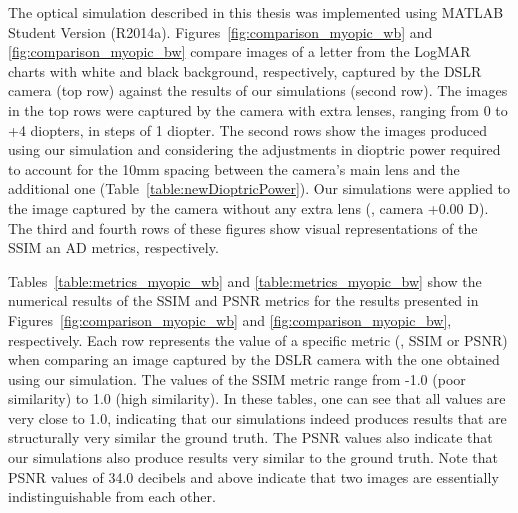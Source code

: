 %
The optical simulation described in this thesis was implemented using MATLAB Student Version (R2014a).
%
Figures~\ref{fig:comparison_myopic_wb} and \ref{fig:comparison_myopic_bw} compare images of a letter from the LogMAR charts with 
white and black background, respectively, captured by the DSLR camera (top row) against the results of our simulations (second row). 
The images in the top rows were captured by the camera with extra lenses, ranging from 0 to +4 diopters, in steps of 1 diopter. The second rows show the images produced using our simulation and considering the adjustments in dioptric power required to account for the 10mm spacing between the camera's main lens and the additional one (Table~\ref{table:newDioptricPower}). Our simulations were applied to the image captured by the camera without any extra lens (\ie, camera +0.00 D). The third and fourth rows of these figures show visual representations of the SSIM an AD metrics, respectively. 


Tables~\ref{table:metrics_myopic_wb} and \ref{table:metrics_myopic_bw} show the numerical results of the SSIM and PSNR metrics for the results presented in Figures~\ref{fig:comparison_myopic_wb} and \ref{fig:comparison_myopic_bw}, respectively. Each row represents the value of a specific metric (\ie, SSIM or PSNR) when comparing an image captured by the DSLR camera with the one obtained using our simulation.  
The values of the SSIM metric range from -1.0 (poor similarity) to 1.0 (high similarity). In these tables, one can see that all values are very close to 1.0, indicating that our simulations indeed produces results that are structurally very  similar the ground truth. The PSNR values also indicate that our simulations also produce results very similar to the ground truth. Note that PSNR values of 34.0 decibels and above indicate that two images are essentially indistinguishable from each other.  


